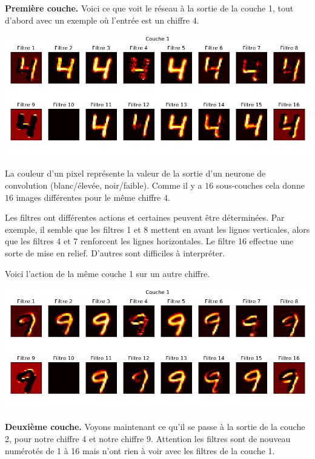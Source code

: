 \documentclass[11pt,class=report,crop=false]{standalone}
\begin{document}
\textbf{Première couche.}
Voici ce que \og{}voit\fg{} le réseau à la sortie de la couche 1, tout d'abord avec un exemple où l'entrée est un chiffre $4$.
\begin{center}
\includegraphics[scale=\myscale,scale=0.65]{figures/tfconv-viz2-n56-4-c1}
\end{center}
La couleur d'un pixel représente la valeur de la sortie d'un neurone de convolution (blanc/élevée, noir/faible). Comme il y a $16$ sous-couches cela donne $16$ images différentes pour le même chiffre $4$. 

Les filtres ont différentes actions et certaines peuvent être déterminées. Par exemple, il semble que les filtres 1 et 8 mettent en avant les lignes verticales, alors que les filtres 4 et 7 renforcent les lignes horizontales. Le filtre 16 effectue une sorte de mise en relief. D'autres sont difficiles à interpréter.

Voici l'action de la même couche 1 sur un autre chiffre.  

\begin{center}
\includegraphics[scale=\myscale,scale=0.65]{figures/tfconv-viz2-n58-9-c1}
\end{center}

\bigskip
\textbf{Deuxième couche.}
Voyons maintenant ce qu'il se passe à la sortie de la couche 2, pour notre chiffre 4 et notre chiffre 9.
Attention les filtres sont de nouveau numérotés de 1 à 16 mais n'ont rien à voir avec les filtres de la couche 1.
\end{document}
